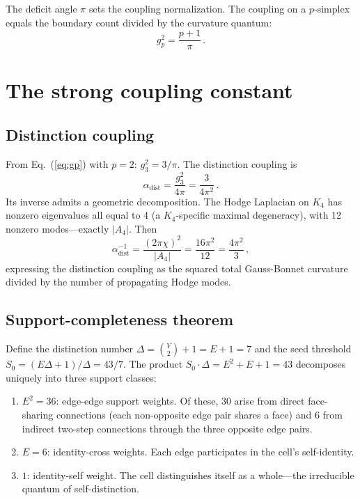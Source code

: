 \documentclass[aip,graphicx]{revtex4-1}
\begin{document}
The deficit angle $\pi$ sets the coupling normalization. The
coupling on a $p$-simplex equals the boundary count divided by the
curvature quantum:
\begin{equation}
\boxed{g_p^2 = \frac{p + 1}{\pi}} \,.
\label{eq:gp}
\end{equation}


\section{The strong coupling constant}
\label{sec:alphas}

\subsection{Distinction coupling}

From Eq.~(\ref{eq:gp}) with $p = 2$: $g_3^2 = 3/\pi$. The
distinction coupling is
\begin{equation}
\alpha_{\mathrm{dist}} = \frac{g_3^2}{4\pi} = \frac{3}{4\pi^2}\,.
\label{eq:alphadist}
\end{equation}
Its inverse admits a geometric decomposition. The Hodge Laplacian on
$K_4$ has nonzero eigenvalues all equal to 4 (a $K_4$-specific
maximal degeneracy), with 12 nonzero modes---exactly $|A_4|$. Then
\begin{equation}
\alpha_{\mathrm{dist}}^{-1} = \frac{(2\pi\chi)^2}{|A_4|}
= \frac{16\pi^2}{12} = \frac{4\pi^2}{3} \,,
\label{eq:invdist}
\end{equation}
expressing the distinction coupling as the squared total
Gauss-Bonnet curvature divided by the number of propagating Hodge
modes.

\subsection{Support-completeness theorem}

Define the distinction number $\Delta = \binom{V}{2} + 1 = E + 1 =
7$ and the seed threshold $S_0 = (E\Delta + 1)/\Delta = 43/7$.
The product $S_0 \cdot \Delta = E^2 + E + 1 = 43$ decomposes
uniquely into three support classes:

\begin{enumerate}
\item $E^2 = 36$: edge-edge support weights. Of these, 30 arise
from direct face-sharing connections (each non-opposite edge pair
shares a face) and 6 from indirect two-step connections through the
three opposite edge pairs.
\item $E = 6$: identity-cross weights. Each edge participates in
the cell's self-identity.
\item $1$: identity-self weight. The cell distinguishes itself as a
whole---the irreducible quantum of self-distinction.
\end{enumerate}
\end{document}
